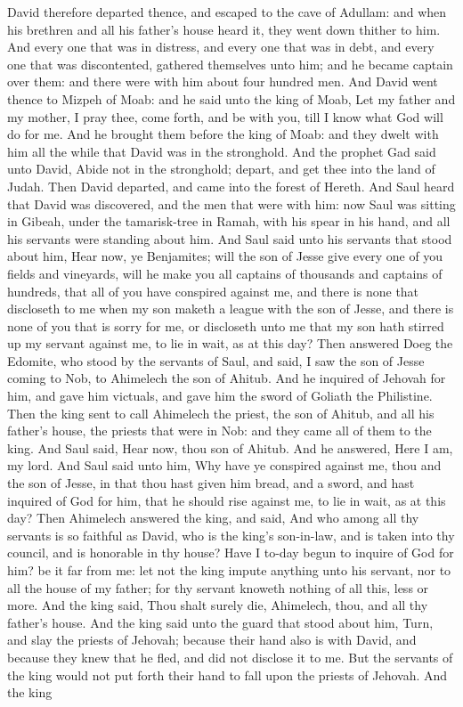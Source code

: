 David therefore departed thence, and escaped to the cave of Adullam: and when his brethren and all his father’s house heard it, they went down thither to him. And every one that was in distress, and every one that was in debt, and every one that was discontented, gathered themselves unto him; and he became captain over them: and there were with him about four hundred men.  And David went thence to Mizpeh of Moab: and he said unto the king of Moab, Let my father and my mother, I pray thee, come forth, and be with you, till I know what God will do for me. And he brought them before the king of Moab: and they dwelt with him all the while that David was in the stronghold. And the prophet Gad said unto David, Abide not in the stronghold; depart, and get thee into the land of Judah. Then David departed, and came into the forest of Hereth.  And Saul heard that David was discovered, and the men that were with him: now Saul was sitting in Gibeah, under the tamarisk-tree in Ramah, with his spear in his hand, and all his servants were standing about him. And Saul said unto his servants that stood about him, Hear now, ye Benjamites; will the son of Jesse give every one of you fields and vineyards, will he make you all captains of thousands and captains of hundreds, that all of you have conspired against me, and there is none that discloseth to me when my son maketh a league with the son of Jesse, and there is none of you that is sorry for me, or discloseth unto me that my son hath stirred up my servant against me, to lie in wait, as at this day? Then answered Doeg the Edomite, who stood by the servants of Saul, and said, I saw the son of Jesse coming to Nob, to Ahimelech the son of Ahitub. And he inquired of Jehovah for him, and gave him victuals, and gave him the sword of Goliath the Philistine.  Then the king sent to call Ahimelech the priest, the son of Ahitub, and all his father’s house, the priests that were in Nob: and they came all of them to the king. And Saul said, Hear now, thou son of Ahitub. And he answered, Here I am, my lord. And Saul said unto him, Why have ye conspired against me, thou and the son of Jesse, in that thou hast given him bread, and a sword, and hast inquired of God for him, that he should rise against me, to lie in wait, as at this day? Then Ahimelech answered the king, and said, And who among all thy servants is so faithful as David, who is the king’s son-in-law, and is taken into thy council, and is honorable in thy house? Have I to-day begun to inquire of God for him? be it far from me: let not the king impute anything unto his servant, nor to all the house of my father; for thy servant knoweth nothing of all this, less or more. And the king said, Thou shalt surely die, Ahimelech, thou, and all thy father’s house. And the king said unto the guard that stood about him, Turn, and slay the priests of Jehovah; because their hand also is with David, and because they knew that he fled, and did not disclose it to me. But the servants of the king would not put forth their hand to fall upon the priests of Jehovah. And the king 